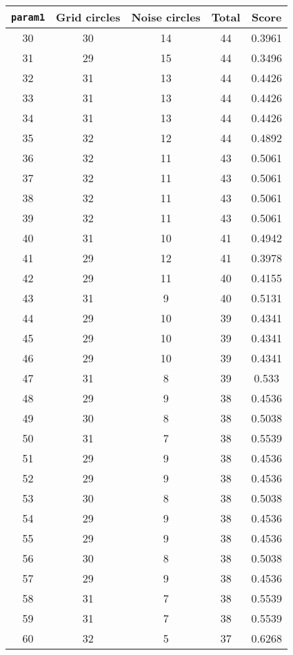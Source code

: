 \documentclass[letterpaper, 12pt]{article}
\begin{document}
\begin{longtable}{|c|c|c|c|c|}
\hline
\textbf{\texttt{param1}} & \textbf{Grid circles} & \textbf{Noise circles} & \textbf{Total} & \textbf{Score} \\
\hline
30 & 30 & 14 & 44 & 0.3961 \\
\hline
31 & 29 & 15 & 44 & 0.3496 \\
\hline
32 & 31 & 13 & 44 & 0.4426 \\
\hline
33 & 31 & 13 & 44 & 0.4426 \\
\hline
34 & 31 & 13 & 44 & 0.4426 \\
\hline
35 & 32 & 12 & 44 & 0.4892 \\
\hline
36 & 32 & 11 & 43 & 0.5061 \\
\hline
37 & 32 & 11 & 43 & 0.5061 \\
\hline
38 & 32 & 11 & 43 & 0.5061 \\
\hline
39 & 32 & 11 & 43 & 0.5061 \\
\hline
40 & 31 & 10 & 41 & 0.4942 \\
\hline
41 & 29 & 12 & 41 & 0.3978 \\
\hline
42 & 29 & 11 & 40 & 0.4155 \\
\hline
43 & 31 & 9 & 40 & 0.5131 \\
\hline
44 & 29 & 10 & 39 & 0.4341 \\
\hline
45 & 29 & 10 & 39 & 0.4341 \\
\hline
46 & 29 & 10 & 39 & 0.4341 \\
\hline
47 & 31 & 8 & 39 & 0.533 \\
\hline
48 & 29 & 9 & 38 & 0.4536 \\
\hline
49 & 30 & 8 & 38 & 0.5038 \\
\hline
50 & 31 & 7 & 38 & 0.5539 \\
\hline
51 & 29 & 9 & 38 & 0.4536 \\
\hline
52 & 29 & 9 & 38 & 0.4536 \\
\hline
53 & 30 & 8 & 38 & 0.5038 \\
\hline
54 & 29 & 9 & 38 & 0.4536 \\
\hline
55 & 29 & 9 & 38 & 0.4536 \\
\hline
56 & 30 & 8 & 38 & 0.5038 \\
\hline
57 & 29 & 9 & 38 & 0.4536 \\
\hline
58 & 31 & 7 & 38 & 0.5539 \\
\hline
59 & 31 & 7 & 38 & 0.5539 \\
\hline
60 & 32 & 5 & 37 & 0.6268 \\

\end{longtable}
\end{document}
